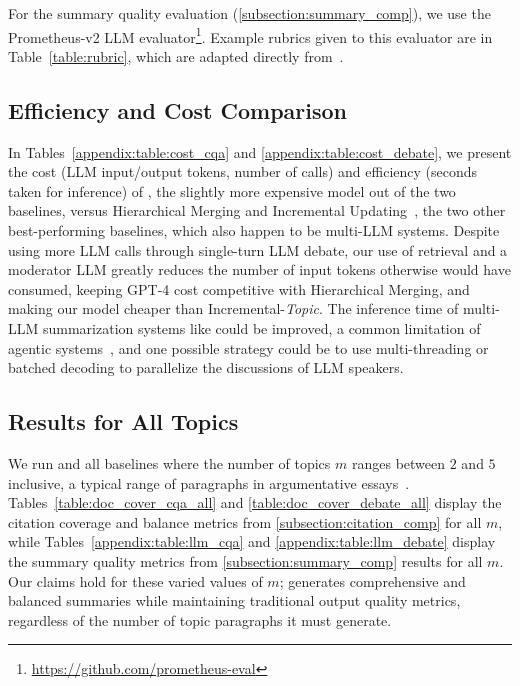 For the summary quality evaluation (\cref{subsection:summary_comp}), we use the Prometheus-v2 LLM evaluator\footnote{\url{https://github.com/prometheus-eval}}.
Example rubrics given to this evaluator are in Table~\ref{table:rubric}, which are adapted directly from~\citet{shao2024assisting}.

\subsection{Efficiency and Cost Comparison} \label{subsection:efficiency}

In Tables~\ref{appendix:table:cost_cqa} and \ref{appendix:table:cost_debate}, we present the cost (LLM input/output tokens, number of calls) and efficiency (seconds taken for inference) of \modelTopic, the slightly more expensive model out of the two \model baselines, versus Hierarchical Merging and Incremental Updating~\cite{chang2024booookscore, adams2023sparse}, the two other best-performing baselines, which also happen to be multi-LLM systems. Despite \model using more LLM calls through single-turn LLM debate, our use of retrieval and a moderator LLM greatly reduces the number of input tokens \model otherwise would have consumed, keeping GPT-4 cost competitive with Hierarchical Merging, and making our model cheaper than Incremental-\textit{Topic}.
The inference time of multi-LLM summarization systems like \model could be improved, a common limitation of agentic systems~\cite{li2024personal}, and one possible strategy could be to use multi-threading or batched decoding to parallelize the discussions of LLM speakers. 

\subsection{Results for All Topics} \label{appendix:results}

We run \model and all baselines where the number of topics $m$ ranges between $2$ and $5$ inclusive, a typical range of paragraphs in argumentative essays~\cite{mery2019use}.
Tables~\ref{table:doc_cover_cqa_all} and \ref{table:doc_cover_debate_all} display the citation coverage and balance metrics from \cref{subsection:citation_comp} for all $m$, while Tables~\ref{appendix:table:llm_cqa} and \ref{appendix:table:llm_debate} display the summary quality metrics from \cref{subsection:summary_comp} results for all $m$.
Our claims hold for these varied values of $m$; \model generates comprehensive and balanced summaries while maintaining traditional output quality metrics, regardless of the number of topic paragraphs it must generate.

